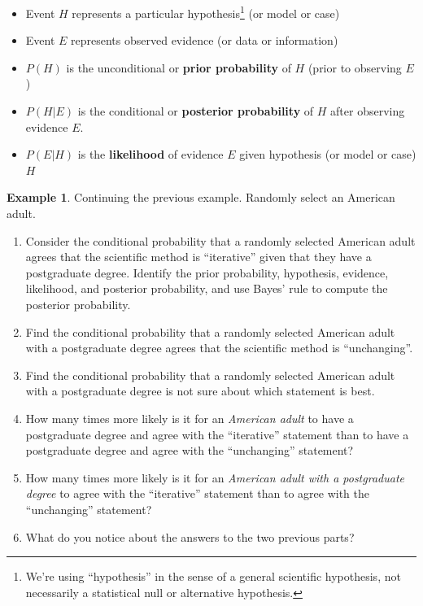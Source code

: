 \documentclass[
]{book}
\providecommand{\tightlist}{%
  \setlength{\itemsep}{0pt}\setlength{\parskip}{0pt}}
\theoremstyle{definition}
\theoremstyle{definition}
\newtheorem{example}{Example}[chapter]
\theoremstyle{definition}
\theoremstyle{remark}
\begin{document}
\begin{itemize}
\tightlist
\item
  Event \(H\) represents a particular hypothesis\footnote{We're using ``hypothesis'' in the sense of a general scientific hypothesis, not necessarily a statistical null or alternative hypothesis.} (or model or case)
\item
  Event \(E\) represents observed evidence (or data or information)
\item
  \(P(H)\) is the unconditional or \textbf{prior probability} of \(H\) (prior to observing \(E\))
\item
  \(P(H|E)\) is the conditional or \textbf{posterior probability} of \(H\) after observing evidence \(E\).
\item
  \(P(E|H)\) is the \textbf{likelihood} of evidence \(E\) given hypothesis (or model or case) \(H\)
\end{itemize}

\begin{example}
\protect\hypertarget{exm:bayes-rule2}{}{\label{exm:bayes-rule2} }
Continuing the previous example. Randomly select an American adult.
\end{example}

\begin{enumerate}
\def\labelenumi{\arabic{enumi}.}
\tightlist
\item
  Consider the conditional probability that a randomly selected American adult agrees that the scientific method is ``iterative'' given that they have a postgraduate degree. Identify the prior probability, hypothesis, evidence, likelihood, and posterior probability, and use Bayes' rule to compute the posterior probability.
\item
  Find the conditional probability that a randomly selected American adult with a postgraduate degree agrees that the scientific method is ``unchanging''.
\item
  Find the conditional probability that a randomly selected American adult with a postgraduate degree is not sure about which statement is best.
\item
  How many times more likely is it for an \emph{American adult} to have a postgraduate degree and agree with the ``iterative'' statement than to have a postgraduate degree and agree with the ``unchanging'' statement?
\item
  How many times more likely is it for an \emph{American adult with a postgraduate degree} to agree with the ``iterative'' statement than to agree with the ``unchanging'' statement?
\item
  What do you notice about the answers to the two previous parts?
\end{enumerate}
\end{document}
